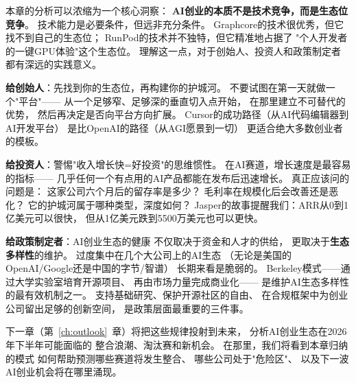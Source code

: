 本章的分析可以浓缩为一个核心洞察：
\textbf{AI创业的本质不是技术竞争，而是生态位竞争}。
技术能力是必要条件，但远非充分条件。
Graphcore的技术很优秀，但它找不到自己的生态位；
RunPod的技术并不独特，但它精准地占据了
"个人开发者的一键GPU体验"这个生态位。
理解这一点，对于创始人、投资人和政策制定者
都有深远的实践意义。

\begin{warnbox}[给不同读者的行动建议]
\textbf{给创始人}：先找到你的生态位，再构建你的护城河。
不要试图在第一天就做一个"平台"——
从一个足够窄、足够深的垂直切入点开始，
在那里建立不可替代的优势，
然后再决定是否向平台方向扩展。
Cursor的成功路径（从AI代码编辑器到AI开发平台）
是比OpenAI的路径（从AGI愿景到一切）
更适合绝大多数创业者的模板。

\textbf{给投资人}：警惕"收入增长快=好投资"的思维惯性。
在AI赛道，增长速度是最容易的指标——
几乎任何一个有点用的AI产品都能在发布后迅速增长。
真正应该问的问题是：
这家公司六个月后的留存率是多少？
毛利率在规模化后会改善还是恶化？
它的护城河属于哪种类型，深度如何？
Jasper的故事提醒我们：ARR从0到1亿美元可以很快，
但从1亿美元跌到5500万美元也可以更快。

\textbf{给政策制定者}：AI创业生态的健康
不仅取决于资金和人才的供给，
更取决于\textbf{生态多样性}的维护。
过度集中在几个大公司上的AI生态
（无论是美国的OpenAI/Google还是中国的字节/智谱）
长期来看是脆弱的。
Berkeley模式——通过大学实验室培育开源项目、
再由市场力量完成商业化——
是维护AI生态多样性的最有效机制之一。
支持基础研究、保护开源社区的自由、
在合规框架中为创业公司留出足够的创新空间，
是政策层面最重要的三件事。
\end{warnbox}

下一章（第~\ref{ch:outlook}~章）将把这些规律投射到未来，
分析AI创业生态在2026年下半年可能面临的
整合浪潮、淘汰赛和新机会。
在那里，我们将看到本章归纳的模式
如何帮助预测哪些赛道将发生整合、
哪些公司处于"危险区"、
以及下一波AI创业机会将在哪里涌现。
